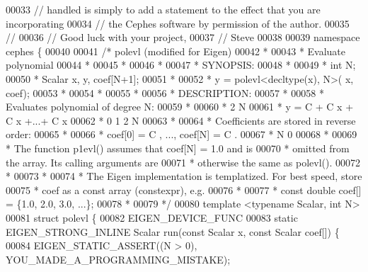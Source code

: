 \begin{DoxyCode}
00033 \textcolor{comment}{//    handled is simply to add a statement to the effect that you are incorporating}
00034 \textcolor{comment}{//    the Cephes software by permission of the author.}
00035 \textcolor{comment}{//}
00036 \textcolor{comment}{//    Good luck with your project,}
00037 \textcolor{comment}{//    Steve}
00038 
00039 \textcolor{keyword}{namespace }cephes \{
00040 
00041 \textcolor{comment}{/* polevl (modified for Eigen)}
00042 \textcolor{comment}{ *}
00043 \textcolor{comment}{ *      Evaluate polynomial}
00044 \textcolor{comment}{ *}
00045 \textcolor{comment}{ *}
00046 \textcolor{comment}{ *}
00047 \textcolor{comment}{ * SYNOPSIS:}
00048 \textcolor{comment}{ *}
00049 \textcolor{comment}{ * int N;}
00050 \textcolor{comment}{ * Scalar x, y, coef[N+1];}
00051 \textcolor{comment}{ *}
00052 \textcolor{comment}{ * y = polevl<decltype(x), N>( x, coef);}
00053 \textcolor{comment}{ *}
00054 \textcolor{comment}{ *}
00055 \textcolor{comment}{ *}
00056 \textcolor{comment}{ * DESCRIPTION:}
00057 \textcolor{comment}{ *}
00058 \textcolor{comment}{ * Evaluates polynomial of degree N:}
00059 \textcolor{comment}{ *}
00060 \textcolor{comment}{ *                     2          N}
00061 \textcolor{comment}{ * y  =  C  + C x + C x  +...+ C x}
00062 \textcolor{comment}{ *        0    1     2          N}
00063 \textcolor{comment}{ *}
00064 \textcolor{comment}{ * Coefficients are stored in reverse order:}
00065 \textcolor{comment}{ *}
00066 \textcolor{comment}{ * coef[0] = C  , ..., coef[N] = C  .}
00067 \textcolor{comment}{ *            N                   0}
00068 \textcolor{comment}{ *}
00069 \textcolor{comment}{ *  The function p1evl() assumes that coef[N] = 1.0 and is}
00070 \textcolor{comment}{ * omitted from the array.  Its calling arguments are}
00071 \textcolor{comment}{ * otherwise the same as polevl().}
00072 \textcolor{comment}{ *}
00073 \textcolor{comment}{ *}
00074 \textcolor{comment}{ * The Eigen implementation is templatized.  For best speed, store}
00075 \textcolor{comment}{ * coef as a const array (constexpr), e.g.}
00076 \textcolor{comment}{ *}
00077 \textcolor{comment}{ * const double coef[] = \{1.0, 2.0, 3.0, ...\};}
00078 \textcolor{comment}{ *}
00079 \textcolor{comment}{ */}
00080 \textcolor{keyword}{template} <\textcolor{keyword}{typename} Scalar, \textcolor{keywordtype}{int} N>
00081 \textcolor{keyword}{struct }polevl \{
00082   EIGEN\_DEVICE\_FUNC
00083   \textcolor{keyword}{static} EIGEN\_STRONG\_INLINE Scalar run(\textcolor{keyword}{const} Scalar x, \textcolor{keyword}{const} Scalar coef[]) \{
00084     EIGEN\_STATIC\_ASSERT((N > 0), YOU\_MADE\_A\_PROGRAMMING\_MISTAKE);

\end{DoxyCode}
